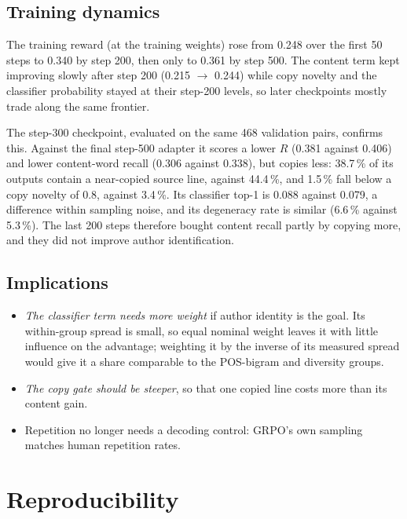 \documentclass[11pt]{article}
\begin{document}
\subsection{Training dynamics}

The training reward (at the training weights) rose from 0.248 over the first
50 steps to 0.340 by step 200, then only to 0.361 by step 500. The content
term kept improving slowly after step 200 (0.215 $\to$ 0.244) while copy
novelty and the classifier probability stayed at their step-200 levels, so
later checkpoints mostly trade along the same frontier.

The step-300 checkpoint, evaluated on the same 468 validation pairs, confirms
this. Against the final step-500 adapter it scores a lower $R$ (0.381 against
0.406) and lower content-word recall (0.306 against 0.338), but copies less:
38.7\,\% of its outputs contain a near-copied source line, against 44.4\,\%,
and 1.5\,\% fall below a copy novelty of 0.8, against 3.4\,\%. Its classifier
top-1 is 0.088 against 0.079, a difference within sampling noise, and its
degeneracy rate is similar (6.6\,\% against 5.3\,\%). The last 200 steps
therefore bought content recall partly by copying more, and they did not
improve author identification.

\subsection{Implications}

\begin{itemize}
  \item \emph{The classifier term needs more weight} if author identity is
    the goal. Its within-group spread is small, so equal nominal weight
    leaves it with little influence on the advantage; weighting it by the
    inverse of its measured spread would give it a share comparable to the
    POS-bigram and diversity groups.
  \item \emph{The copy gate should be steeper}, so that one copied line
    costs more than its content gain.
  \item Repetition no longer needs a decoding control: GRPO's own sampling
    matches human repetition rates.
\end{itemize}

\section{Reproducibility}
\end{document}

